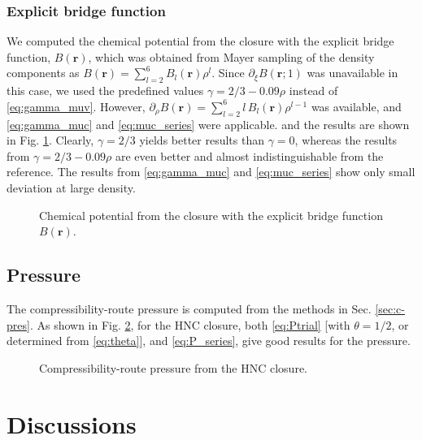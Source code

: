 \documentclass[aip,jcp,reprint,superscriptaddress]{revtex4-1}
\newcommand{\vct}[1]{\mathbf{#1}}
\providecommand{\vr}{} %
\renewcommand{\vr}{\vct{r}}
\begin{document}
\subsubsection{Explicit bridge function}


We computed the chemical potential from the closure with
the explicit bridge function, $B(\vr)$,
which was obtained from Mayer sampling
of the density components as $B(\vr) = \sum_{l = 2}^{6} B_l(\vr) \rho^l$.
%
Since $\partial_\xi B(\vr; 1)$ was unavailable in this case,
we used the predefined values $\gamma = 2/3-0.09\rho$
instead of \eqref{eq:gamma_muv}.
%
However, $\partial_\rho B(\vr) = \sum_{l = 2}^{6} l \, B_l(\vr) \rho^{l-1}$
was available,
and \eqref{eq:gamma_muc} and \eqref{eq:muc_series} were applicable.
%
and the results are shown in Fig. \ref{fig:muBr}.
%
Clearly, $\gamma = 2/3$ yields better results than $\gamma = 0$,
whereas the results from $\gamma = 2/3-0.09\rho$
are even better and almost indistinguishable from the reference.
%
The results from \eqref{eq:gamma_muc} and \eqref{eq:muc_series}
show only small deviation at large density.
%
\begin{figure}[h]
  \caption{
    \label{fig:muBr}
    Chemical potential from the closure with the explicit bridge function $B(\vr)$.
  }
\end{figure}




\subsection{Pressure}


The compressibility-route pressure is computed from the methods in Sec. \ref{sec:c-pres}.
%
As shown in Fig. \ref{fig:Phnc}, for the HNC closure,
%
both \eqref{eq:Ptrial}
[with $\theta = 1/2$, or determined from \eqref{eq:theta}],
and \eqref{eq:P_series},
give good results for the pressure.
%


\begin{figure}[h]
  \caption{
    \label{fig:Phnc}
    Compressibility-route pressure from the HNC closure.
  }
\end{figure}






\section{Discussions}
\end{document}
